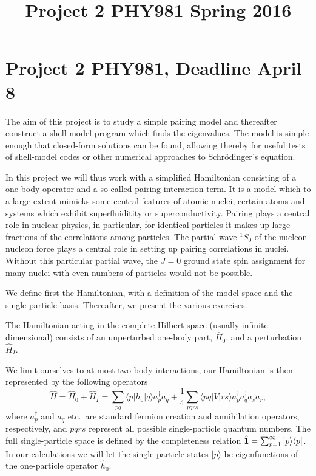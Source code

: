 \documentclass[prc]{revtex4}
\begin{document}
\title{Project 2 PHY981 Spring 2016}
\maketitle
\section*{Project 2 PHY981, Deadline April 8}

The aim of this project is to study a simple pairing model and thereafter construct a shell-model program which finds the eigenvalues.
The model is simple enough that closed-form solutions can be found, allowing thereby for useful tests of shell-model codes or other
numerical approaches to Schr\"odinger's equation. 

In this project we will thus work with a simplified Hamiltonian consisting of a one-body operator and a so-called 
 pairing interaction term. It is a model which to a large extent mimicks some central features of
atomic nuclei, certain atoms and systems which exhibit superfluiditity or superconductivity.  
Pairing plays a central role in nuclear physics, in particular, for identical particles it makes up large fractions of the correlations among particles. The partial wave $^{1}S_0$ of the nucleon-nucleon force plays a central role in setting up pairing correlations in nuclei. Without this particular partial wave, the $J=0$ ground state spin assignment for many nuclei with even numbers of particles would not be possible. 


We define first the Hamiltonian, with a definition of the model space and
the single-particle basis. Thereafter, we present the various exercises.

The Hamiltonian acting in the complete Hilbert space (usually infinite
dimensional) consists of an unperturbed one-body part, $\hat{H}_0$,
and a perturbation $\hat{H}_I$. 

We limit ourselves to at most two-body interactions, our Hamiltonian  is 
then represented by the following operators
\begin{equation}
\hat{H} = \hat{H}_0 +\hat{H}_I=\sum_{pq}\langle p |h_0|q\rangle a_{p}^{\dagger}a_{q} +\frac{1}{4}\sum_{pqrs}\langle pq| V|rs\rangle a_{p}^{\dagger}a_{q}^{\dagger}a_{s}a_{r},
\label{eq:hamiltonian}
\end{equation}
where $a_{p}^{\dagger}$ and $a_{q}$ etc.~are standard fermion creation and annihilation operators, respectively,
and $pqrs$ represent all possible single-particle quantum numbers. 
The full single-particle space is defined by the completeness relation
$\hat{{\bf 1}} = \sum_{p =1}^{\infty}|p \rangle \langle p|$.
In our calculations  we will let  the single-particle states $|p\rangle$
be eigenfunctions of  the one-particle operator $\hat{h}_0$. 
\end{document}
